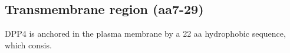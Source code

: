 \subsection{Transmembrane region (aa7-29)}

DPP4 is anchored in the plasma membrane by a 22 aa hydrophobic sequence, which consis. \cite{Hong_1990}